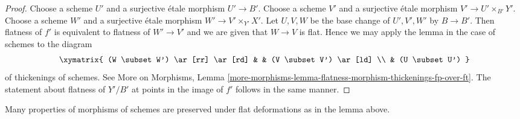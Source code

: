 \begin{proof}
Choose a scheme $U'$ and a surjective \'etale morphism $U' \to B'$.
Choose a scheme $V'$ and a surjective \'etale morphism
$V' \to U' \times_{B'} Y'$.
Choose a scheme $W'$ and a surjective \'etale morphism
$W' \to V' \times_{Y'} X'$. Let $U, V, W$ be the base change
of $U', V', W'$ by $B \to B'$. Then flatness of $f'$ is
equivalent to flatness of $W' \to V'$ and we are
given that $W \to V$ is flat. Hence we may apply the lemma
in the case of schemes to the diagram
$$
\xymatrix{
(W \subset W') \ar[rr] \ar[rd] & & (V \subset V') \ar[ld] \\
& (U \subset U')
}
$$
of thickenings of schemes. See
More on Morphisms, Lemma
\ref{more-morphisms-lemma-flatness-morphism-thickenings-fp-over-ft}.
The statement about flatness of $Y'/B'$ at points in the
image of $f'$ follows in the same manner.
\end{proof}

\noindent
Many properties of morphisms of schemes are preserved under flat
deformations as in the lemma above.

